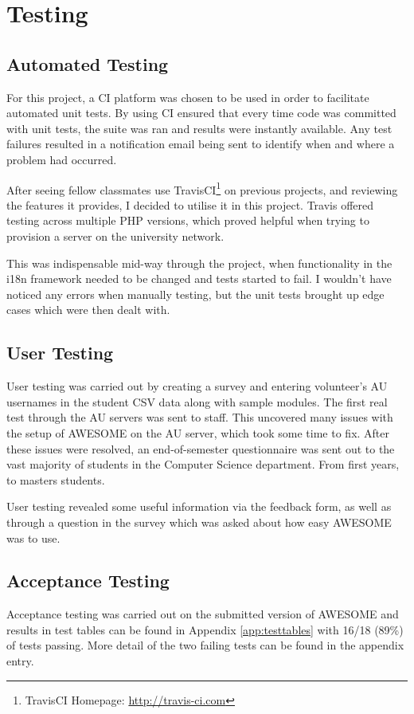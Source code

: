 \chapter{Testing}
	
	\section{Automated Testing}
	
	For this project, a \ac{CI} platform was chosen to be used in order to facilitate automated unit tests.
	By using \ac{CI} ensured that every time code was committed with unit tests, the suite was ran and results were instantly available.
	Any test failures resulted in a notification email being sent to identify when and where a problem had occurred.
	
	After seeing fellow classmates use TravisCI\footnote{TravisCI Homepage: \url{http://travis-ci.com}} on previous projects, and reviewing the features it provides, I decided to utilise it in this project.
	Travis offered testing across multiple PHP versions, which proved helpful when trying to provision a server on the university network.
	
	This was indispensable mid-way through the project, when functionality in the \ac{i18n} framework needed to be changed and tests started to fail.
	I wouldn't have noticed any errors when manually testing, but the unit tests brought up edge cases which were then dealt with.
	
	\section{User Testing}
	
	User testing was carried out by creating a survey and entering volunteer's \ac{AU} usernames in the student \ac{CSV} data along with sample modules.
	The first real test through the \ac{AU} servers was sent to staff.
	This uncovered many issues with the setup of \ac{AWESOME} on the \ac{AU} server, which took some time to fix.
	After these issues were resolved, an end-of-semester questionnaire was sent out to the vast majority of students in the Computer Science department.
	From first years, to masters students.
	
	User testing revealed some useful information via the feedback form, as well as through a question in the survey which was asked about how easy \ac{AWESOME} was to use.
	
	\section{Acceptance Testing}
	
	Acceptance testing was carried out on the submitted version of \ac{AWESOME} and results in test tables can be found in Appendix \autoref{app:testtables} with 16/18 (89\%) of tests passing.
	More detail of the two failing tests can be found in the appendix entry.
